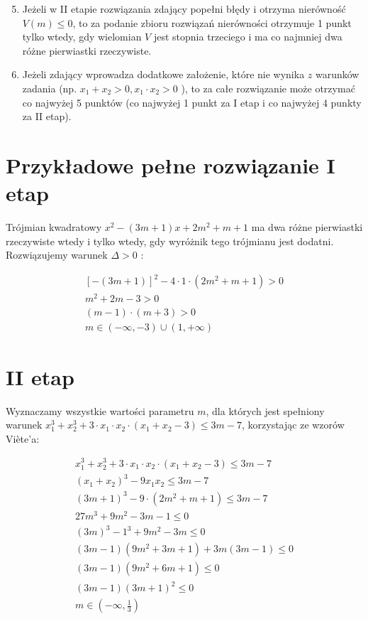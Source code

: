 \documentclass[10pt]{article}
\begin{document}
\begin{enumerate}
  \setcounter{enumi}{4}
  \item Jeżeli w II etapie rozwiązania zdający popełni błędy i otrzyma nierówność $V(m) \leq 0$, to za podanie zbioru rozwiązań nierówności otrzymuje 1 punkt tylko wtedy, gdy wielomian $V$ jest stopnia trzeciego i ma co najmniej dwa różne pierwiastki rzeczywiste.
  \item Jeżeli zdający wprowadza dodatkowe założenie, które nie wynika $z$ warunków zadania (np. $x_{1}+x_{2}>0, x_{1} \cdot x_{2}>0$ ), to za całe rozwiązanie może otrzymać co najwyżej 5 punktów (co najwyżej 1 punkt za I etap i co najwyżej 4 punkty za II etap).
\end{enumerate}

\section*{Przykładowe pełne rozwiązanie I etap}
Trójmian kwadratowy $x^{2}-(3 m+1) x+2 m^{2}+m+1$ ma dwa różne pierwiastki rzeczywiste wtedy i tylko wtedy, gdy wyróżnik tego trójmianu jest dodatni. Rozwiązujemy warunek $\Delta>0$ :

$$
\begin{gathered}
{[-(3 m+1)]^{2}-4 \cdot 1 \cdot\left(2 m^{2}+m+1\right)>0} \\
m^{2}+2 m-3>0 \\
(m-1) \cdot(m+3)>0 \\
m \in(-\infty,-3) \cup(1,+\infty)
\end{gathered}
$$

\section*{II etap}
Wyznaczamy wszystkie wartości parametru $m$, dla których jest spełniony warunek $x_{1}^{3}+x_{2}^{3}+3 \cdot x_{1} \cdot x_{2} \cdot\left(x_{1}+x_{2}-3\right) \leq 3 m-7$, korzystając ze wzorów Viète'a:

$$
\begin{gathered}
x_{1}^{3}+x_{2}^{3}+3 \cdot x_{1} \cdot x_{2} \cdot\left(x_{1}+x_{2}-3\right) \leq 3 m-7 \\
\left(x_{1}+x_{2}\right)^{3}-9 x_{1} x_{2} \leq 3 m-7 \\
(3 m+1)^{3}-9 \cdot\left(2 m^{2}+m+1\right) \leq 3 m-7 \\
27 m^{3}+9 m^{2}-3 m-1 \leq 0 \\
(3 m)^{3}-1^{3}+9 m^{2}-3 m \leq 0 \\
(3 m-1)\left(9 m^{2}+3 m+1\right)+3 m(3 m-1) \leq 0 \\
(3 m-1)\left(9 m^{2}+6 m+1\right) \leq 0 \\
(3 m-1)(3 m+1)^{2} \leq 0 \\
m \in\left(-\infty, \frac{1}{3}\right)
\end{gathered}
$$
\end{document}
